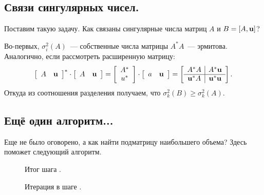\subsection{Связи сингулярных чисел.}
\label{sect:con}

Поставим такую задачу. Как связаны сингулярные числа матриц $A$ и $B=[A,\mathbf{u}]$?

Во-первых, $\sigma_i^2(A)$~--- собственные числа матрицы $A^*A$~--- эрмитова. Аналогично, если рассмотреть расширенную матрицу:
\[
    \left[
        \begin{array}{cc}
            A & \mathbf{u}
        \end{array}
        \right]^*\cdot\left[
        \begin{array}{cc}
            A & \mathbf{u}
        \end{array}
        \right]=\left[
        \begin{array}{c}
            A^* \\
            u^*
        \end{array}
        \right]\cdot\left[
        \begin{array}{cc}
            a & \mathbf{u}
        \end{array}
        \right] = \left[
        \begin{array}{c|c}
            A^*A        & A^*\mathbf{u}        \\
            \hline
            \mathbf{u}^*A & \mathbf{u}^*\mathbf{u}
        \end{array}
        \right].
\]
Откуда из соотношения разделения получаем, что $\sigma_k^2(B)\geqslant\sigma_k^2(A)$.

\subsection{Ещё один алгоритм...}

Еще не было оговорено, а как найти подматрицу наибольшего объема? Здесь поможет следующий алгоритм.

\begin{figure}[!ht]
    \centering
    \begin{minipage}{.5\textwidth}
        \centering
        
        \caption{Итог шага \protect{}.}
        \label{fig:lect05_algo}
    \end{minipage}%
    \begin{minipage}{.5\textwidth}
        \centering
        
        \caption{Итерация в шаге \protect{}.}
        \label{fig:lect05_step2}
    \end{minipage}
\end{figure}

